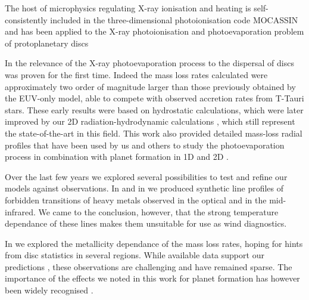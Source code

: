 \documentclass[10pt,fleqn,twoside]{article}
\begin{document}
 The host of microphysics regulating
X-ray ionisation and heating is self-consistently included in the
three-dimensional photoionisation code MOCASSIN 
\citep{2003MNRAS.340.1136E, 2005MNRAS.362.1038E, 2008ApJS..175..534E}
and has been applied to the X-ray photoionisation and
photoevaporation problem of protoplanetary discs 
\citep{2008ApJ...688..398E, 2009ApJ...699.1639E, 
2010MNRAS.406.1553E, 2016MNRAS.460.3472E, 
2010MNRAS.401.1415O, 2011MNRAS.412...13O, 2012MNRAS.422.1880O}


In 
\citet{2008ApJ...688..398E, 2009ApJ...699.1639E}
the relevance of the X-ray photoevaporation process
to the dispersal of discs was proven for the first time. Indeed the mass
loss rates calculated were approximately two order of magnitude larger
than those previously obtained by the EUV-only model, able to compete
with observed accretion rates from T-Tauri stars. These early results
were based on hydrostatic calculations, which were later improved by
our 2D radiation-hydrodynamic calculations 
\citep{2010MNRAS.401.1415O, 2011MNRAS.412...13O, 2012MNRAS.422.1880O},
which still represent the state-of-the-art in
this field. This work also provided detailed mass-loss radial profiles
that have been used by us and others to study the photoevaporation
process in combination with planet formation in 1D and 2D
\citep[e.g.,][]{2013MNRAS.430.1392R, 2015MNRAS.454.2173R, 2015MNRAS.450.3008E}.

Over the last few years we explored several possibilities to test and refine our
models against observations. In 
\citet{2010MNRAS.406.1553E, 2016MNRAS.460.3472E}
and in
\citet{2010MNRAS.401.1636S}
we
produced synthetic line profiles of forbidden transitions of heavy
metals observed in the optical and in the mid-infrared. We came to the
conclusion, however, that the strong temperature dependance of these
lines makes them unsuitable for use as wind diagnostics. 

In 
\citet{2010MNRAS.402.2735E}
we explored the metallicity dependance of the mass
loss rates, hoping for hints from disc statistics in several
regions. While available data support our predictions 
\citep{2009AIPC.1158..171Y, 2010ApJ...723L.113Y},
these observations are challenging and have
remained sparse. The importance of the effects we noted in this
work for planet formation has however been widely recognised
\citep[e.g.,][]{2016arXiv161001170L}.
\end{document}
